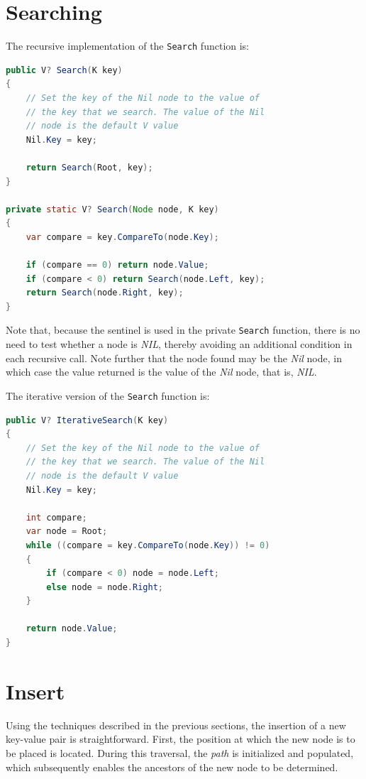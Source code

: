 \documentclass{article}
\begin{document}
\section{Searching}

The recursive implementation of the \texttt{Search} function is:
\begin{lstlisting}[language=java]
public V? Search(K key)
{
    // Set the key of the Nil node to the value of 
    // the key that we search. The value of the Nil
    // node is the default V value
    Nil.Key = key;

    return Search(Root, key);
}

private static V? Search(Node node, K key)
{
    var compare = key.CompareTo(node.Key);

    if (compare == 0) return node.Value;
    if (compare < 0) return Search(node.Left, key);
    return Search(node.Right, key);
}
\end{lstlisting}
Note that, because the sentinel is used in the private \texttt{Search} function,
there is no need to test whether a node is \emph{NIL}, thereby avoiding an additional condition in each recursive call.
Note further that the node found may be the \emph{Nil} node, in which case the value returned is the value of the
\emph{Nil} node, that is, \emph{NIL}.

The iterative version of the \texttt{Search} function is:
\begin{lstlisting}[language=java]
public V? IterativeSearch(K key)
{
    // Set the key of the Nil node to the value of 
    // the key that we search. The value of the Nil
    // node is the default V value
    Nil.Key = key;

    int compare;
    var node = Root;
    while ((compare = key.CompareTo(node.Key)) != 0)
    {
        if (compare < 0) node = node.Left;
        else node = node.Right;
    }

    return node.Value;
}
\end{lstlisting}

\section{Insert}

Using the techniques described in the previous sections, the insertion of a new key-value pair is straightforward.
First, the position at which the new node is to be placed is located. During this traversal, the \emph{path} is
initialized and populated, which subsequently enables the ancestors of the new node to be determined.
\end{document}
